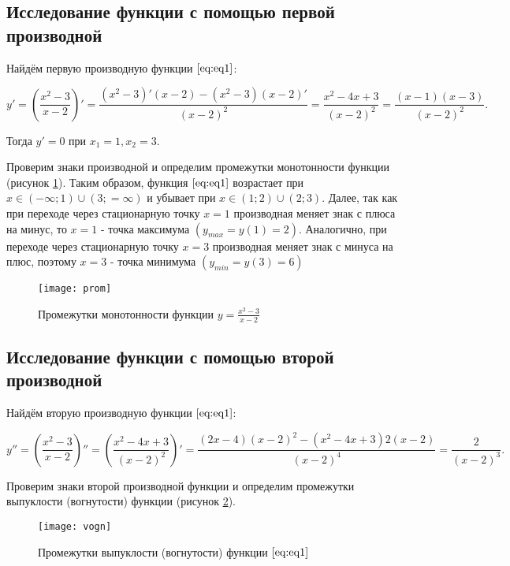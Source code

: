 \subsection{Исследование функции с помощью первой производной}

Найдём первую производную функции $\eqref{eq:eq1}$:

\[y' = \left(\frac{x^2-3}{x-2}\right)' = \frac{(x^2-3)'(x-2)-(x^2-3)(x-2)'}{(x-2)^2}  = \frac{x^2-4x+3}{(x-2)^2} = \frac{(x-1)(x-3)}{(x-2)^2}.\]

Тогда $y' = 0$ при $x_1 = 1, x_2 = 3$.

Проверим знаки производной и определим промежутки монотонности функции (рисунок \ref{pic:prom}). Таким образом, функция $\eqref{eq:eq1}$ возрастает при $x \in (-\infty;1) \cup (3; =\infty)$ и убывает при $x \in (1;2) \cup (2;3)$. Далее, так как при переходе через стационарную точку $x = 1$ производная меняет знак с плюса на минус, то $x=1$ - точка максимума $(y_{max} = y(1) = 2)$. Аналогично, при переходе через стационарную точку
$x = 3$ производная меняет знак с минуса на плюс, поэтому $x = 3$ - точка минимума $(y_{min} = y(3) = 6)$

\begin{figure}[H]
	\begin{center}
		\texttt{[image: prom]}
		\caption{Промежутки монотонности функции $y = \frac{x^2-3}{x-2}$}
		\label{pic:prom}
	\end{center}
\end{figure}

\subsection{Исследование функции с помощью второй производной}

Найдём вторую производную функции $\eqref{eq:eq1}$:

\[y'' = \left(\frac{x^2-3}{x-2}\right)'' = \left(\frac{x^2-4x+3}{(x-2)^2}\right)' = \frac{(2x-4)(x-2)^2 - (x^2-4x+3)2(x-2)}{(x-2)^4} = \frac{2}{(x-2)^3}.\]

Проверим знаки второй производной функции и определим промежутки выпуклости (вогнутости) функции (рисунок \ref{pic:vogn}).

\begin{figure}[H]
	\begin{center}
		\texttt{[image: vogn]}
		\caption{Промежутки выпуклости (вогнутости) функции $\eqref{eq:eq1}$}
		\label{pic:vogn}
	\end{center}
\end{figure}

